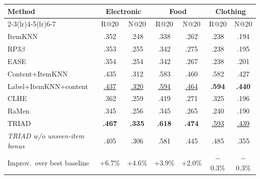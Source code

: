 \begin{tabular}{lcccccc}
\toprule
Method & \multicolumn{2}{c}{Electronic} & \multicolumn{2}{c}{Food} & \multicolumn{2}{c}{Clothing}\\
\cmidrule(lr){2-3}\cmidrule(lr){4-5}\cmidrule(lr){6-7}
 & R@20 & N@20 & R@20 & N@20 & R@20 & N@20\\
\midrule
ItemKNN & .352 & .248 & .338 & .262 & .238 & .194\\
RP3$\beta$ & .353 & .255 & .342 & .275 & .238 & .195\\
EASE & .354 & .254 & .342 & .267 & .238 & .201\\
Content+ItemKNN & .435 & .312 & .583 & .460 & .582 & .427\\
Label+ItemKNN+content & \underline{.437} & \underline{.320} & \underline{.594} & \underline{.464} & \textbf{.594} & \textbf{.440}\\
\midrule
CLHE & .362 & .259 & .419 & .271 & .325 & .196\\
RaMen & .345 & .256 & .345 & .265 & .240 & .190\\
\midrule
TRIAD & \textbf{.467} & \textbf{.335} & \textbf{.618} & \textbf{.474} & \underline{.593} & \underline{.439}\\
\emph{TRIAD w/o unseen-item bonus} & .405 & .306 & .581 & .445 & .485 & .355\\
\midrule
Improv.\ over best baseline & +6.7\% & +4.6\% & +3.9\% & +2.0\% & $-$0.3\% & $-$0.3\%\\
\bottomrule
\end{tabular}
